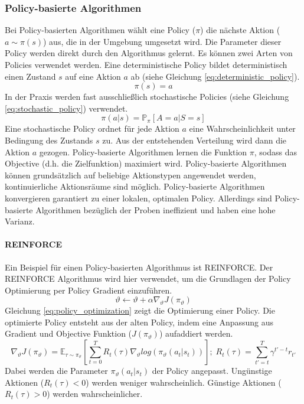 \subsubsection{Policy-basierte Algorithmen}\label{sec:policy_gradient}
Bei Policy-basierten Algorithmen wählt eine Policy ($\pi$) die nächste Aktion ($a \sim \pi(s)$) aus, die in der Umgebung umgesetzt wird. Die Parameter dieser Policy werden direkt durch den Algorithmus gelernt. Es können zwei Arten von Policies verwendet werden. Eine deterministische Policy bildet deterministisch einen Zustand $s$ auf eine Aktion $a$ ab (siehe Gleichung \ref{eq:deterministic_policy}). \cite{FoundationsDeepRL}
\begin{equation}
    \pi(s) = a
    \label{eq:deterministic_policy}
\end{equation}
In der Praxis werden fast ausschließlich stochastische Policies (siehe Gleichung \ref{eq:stochastic_policy}) verwendet.
\begin{equation}
    \pi(a\vert s) = \mathbb{P}_{\pi}\left[ A=a \vert S=s \right]
    \label{eq:stochastic_policy}
\end{equation}
Eine stochastische Policy ordnet für jede Aktion $a$ eine Wahrscheinlichkeit unter Bedingung des Zustands $s$ zu. Aus der entstehenden Verteilung wird dann die Aktion $a$ gezogen. Policy-basierte Algorithmen lernen die Funktion $\pi$, sodass das Objective (d.h. die Zielfunktion) maximiert wird.
Policy-basierte Algorithmen können grundsätzlich auf beliebige Aktionstypen angewendet werden, kontinuierliche Aktionsräume sind möglich. Policy-basierte Algorithmen konvergieren garantiert zu einer lokalen, optimalen Policy. Allerdings sind Policy-basierte Algorithmen bezüglich der Proben ineffizient und haben eine hohe Varianz. \cite{deepRL-2020}

\paragraph{REINFORCE}\fup
Ein Beispiel für einen Policy-basierten Algorithmus ist REINFORCE. Der REINFORCE Algorithmus wird hier verwendet, um die Grundlagen der Policy Optimierung per Policy Gradient einzuführen.
\begin{equation}
    \vartheta \leftarrow \vartheta + \alpha \nabla_\vartheta J(\pi_\vartheta)
    \label{eq:policy_optimization}
\end{equation}
Gleichung \ref{eq:policy_optimization} zeigt die Optimierung einer Policy. Die optimierte Policy entsteht aus der alten Policy, indem eine Anpassung aus Gradient und Objective Funktion ($J(\pi_\vartheta)$) aufaddiert werden.
\begin{equation}
    \nabla_\vartheta J(\pi_\vartheta) = \mathbb{E}_{\tau\sim\pi_\vartheta} \left[ \sum_{t=0}^T R_t(\tau) \nabla_\vartheta log(\pi_\vartheta(a_t\vert s_t))\right]
    ;\; R_t(\tau) = \sum_{t'=t}^T \gamma^{t'-t} r_{t'}
    \label{eq:gradient_objective_function}
\end{equation}
Dabei werden die Parameter $\pi_\vartheta(a_t\vert s_t)$ der Policy angepasst. Ungünstige Aktionen ($R_t(\tau) < 0$) werden weniger wahrscheinlich. Günstige Aktionen ($R_t(\tau) > 0$) werden wahrscheinlicher. \cite{FoundationsDeepRL}


